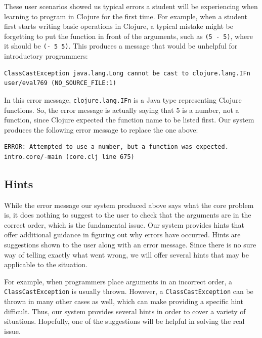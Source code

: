 \documentclass[12pt]{article}
\newcommand{\comment}[1]{{\bf \tt  {#1}}}
\newcommand{\emcomment}[1]{\textcolor{ForestGreen}{\comment{Elena: {#1}}}}
\begin{document}
These user scenarios showed us typical errors a student will be experiencing when 
learning to program in Clojure for the first time.
For example, when a student first starts writing basic operations in Clojure, a typical 
mistake might be forgetting to put the function in front of the arguments,
such as \texttt{(5 - 5)}, where it should be \texttt{(- 5 5)}. 
This produces a message that would be unhelpful for introductory programmers: 

\begin{verbatim}
ClassCastException java.lang.Long cannot be cast to clojure.lang.IFn
user/eval769 (NO_SOURCE_FILE:1)
\end{verbatim}

In this error message, \texttt{clojure.lang.IFn} is a Java type representing Clojure 
functions. So, the error message is actually saying that 5 is a number, not a function, 
since Clojure expected the function name to be listed first. Our system produces the 
following error message to replace the one above:

\begin{verbatim}
ERROR: Attempted to use a number, but a function was expected.
intro.core/-main (core.clj line 675)
\end{verbatim}


\subsection{Hints}\label{sec:hints}

While the error message our system produced above says what the core problem is, it does 
nothing to suggest to the user to check that the arguments are in the correct order, 
which is the fundamental issue.
Our system provides hints that offer additional guidance in figuring out why errors have 
occurred.
Hints are suggestions shown to the user along with an error message.
Since there is no sure way of telling exactly what went wrong, we will offer several 
hints that may be applicable to the situation.

For example, when programmers place arguments in an incorrect order, a 
\texttt{ClassCastException} is usually thrown.
However, a \texttt{ClassCastException} can be thrown in many other cases as well, which 
can make providing a specific hint difficult.
Thus, our system provides several hints in order to cover a variety of situations.
Hopefully, one of the suggestions will be helpful in solving the real issue.
\end{document}

